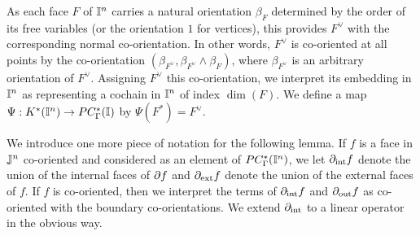 As each face $F$ of $\mathbb{I}^n$ carries a natural orientation $\beta_F$ determined by the order of its free variables (or the orientation $1$ for vertices), this provides $F^\vee$ with the corresponding normal co-orientation. In other words, $F^\vee$ is co-oriented at all points by the co-orientation $(\beta_{F^\vee},\beta_{F^\vee}\wedge \beta_F)$, where $\beta_{F^\vee}$ is an arbitrary orientation of $F^\vee$. Assigning $F^\vee$ this co-orientation, we interpret its embedding in $\mathbb{I}^n$ as representing a cochain in $\mathbb{I}^n$ of index $\dim(F)$.
We define a map $\Psi: K^*(\mathbb{I}^n)\to PC_\Gamma^*(\mathbb{I})$ by $\Psi(F^*)=F^\vee$.

We introduce one more piece of notation for the following lemma. If $f$ is a face in $\mathbb{J}^n$ co-oriented and considered as an element of $PC^*_\Gamma(\mathbb{I}^n)$, we let $\partial_{\text{int}}f$ denote the union of the internal faces of $\partial f$ and $\partial_{\text{ext}}f$ denote the union of the external faces of $f$. If $f$ is co-oriented, then we interpret the terms of $\partial_{\text{int}}f$ and $\partial_{\text{out}}f$ as co-oriented with the boundary co-orientations. We extend $\partial_{\text{int}}$ to a linear operator in the obvious way.






